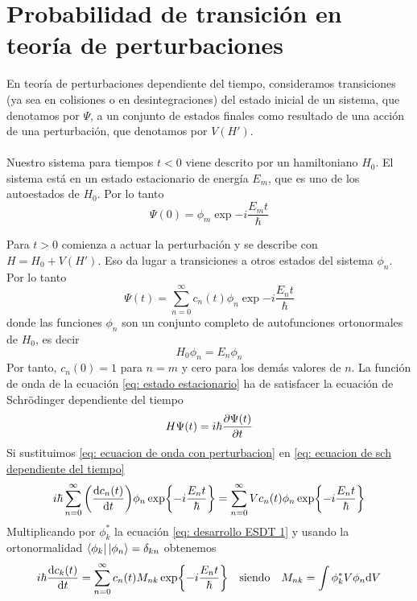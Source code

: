 \pagestyle{fancy}
\chapter{Probabilidad de transición en teoría de perturbaciones}
\label{chap: Apendice A}
En teoría de perturbaciones dependiente del tiempo, consideramos transiciones (ya sea en colisiones o en desintegraciones) del estado inicial de un sistema, que denotamos por $\Psi$, a un conjunto de estados finales como resultado de una acción de una perturbación, que denotamos por $V(H')$.\\\\
Nuestro sistema para tiempos $t<0$ viene descrito por un hamiltoniano $H_0$. El sistema está en un estado estacionario de energía $E_m$, que es uno de los autoestados de $H_0$. Por lo tanto 
\begin{equation}
    \Psi(0)=\phi_m \exp{-i \frac{E_mt}{\hbar}}
    \label{eq: estado estacionario}
\end{equation}

Para $t>0$ comienza a actuar la perturbación y se describe con $H=H_0+V(H')$. Eso da lugar a transiciones a otros estados del sistema $\phi_n$. Por lo tanto
\begin{equation}
    \Psi (t)=\sum^\infty _{n=0} c_n(t) \phi_n \exp{-i \frac{E_nt}{\hbar}}
    \label{eq: ecuacion de onda con perturbacion}
\end{equation}
donde las funciones $\phi_n$ son un conjunto completo de autofunciones ortonormales de $H_0$, es decir
\begin{equation}
    H_0\phi_n=E_n\phi_n
    \label{eq: ecuacion de sch independiente del tiempo}
\end{equation}
Por tanto, $c_n(0)=1$ para $n=m$ y cero para los demás valores de $n$. La función de onda de la ecuación \ref{eq: estado estacionario} ha de satisfacer la ecuación de Schrödinger dependiente del tiempo
\begin{equation}
    H\Psi(t)=i\hbar \pdv{\Psi(t)}{t}
    \label{eq: ecuacion de sch dependiente del tiempo}
\end{equation}
Si sustituimos \ref{eq: ecuacion de onda con perturbacion} en \ref{eq: ecuacion de sch dependiente del tiempo}
\begin{equation}
    i\hbar \sum^\infty _{n=0} \qty(\dv{c_n(t)}{t}) \phi_n \exp{-i \frac{E_nt}{\hbar}} =\sum^\infty _{n=0} Vc_n(t) \phi_n \exp{-i \frac{E_nt}{\hbar}}
    \label{eq: desarrollo ESDT 1}
\end{equation}
Multiplicando por $\phi_k^*$ la ecuación \ref{eq: desarrollo ESDT 1} y usando la ortonormalidad $\bra{\phi_k}\ket{\phi_n}=\delta_{kn}$ obtenemos
\begin{equation}
   i\hbar \dv{c_k(t)}{t}= \sum^\infty _{n=0} c_n(t) M_{nk} \exp{-i \frac{E_nt}{\hbar}} \quad \text{siendo} \quad M_{nk}=\int \phi_k^* V \phi_n \dd V
\end{equation}

